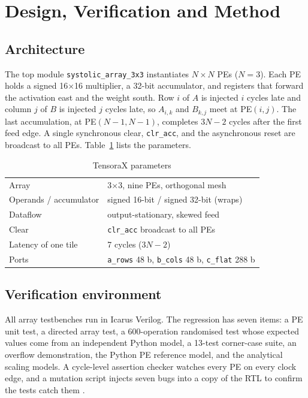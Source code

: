 \documentclass[conference]{IEEEtran}
\begin{document}
\section{Design, Verification and Method}
\subsection{Architecture}
The top module \texttt{systolic\_array\_3x3} instantiates $N\times N$ PEs ($N=3$). Each PE holds a signed 16$\times$16 multiplier, a 32-bit accumulator, and registers that forward the activation east and the weight south. Row $i$ of $A$ is injected $i$ cycles late and column $j$ of $B$ is injected $j$ cycles late, so $A_{i,k}$ and $B_{k,j}$ meet at PE$(i,j)$. The last accumulation, at PE$(N-1,N-1)$, completes $3N-2$ cycles after the first feed edge. A single synchronous clear, \texttt{clr\_acc}, and the asynchronous reset are broadcast to all PEs. Table~\ref{tab:params} lists the parameters.

\begin{table}[!t]
\caption{TensoraX parameters}
\label{tab:params}
\centering\footnotesize
\begin{tabular}{@{}ll@{}}
\toprule
Array & 3$\times$3, nine PEs, orthogonal mesh \\
Operands / accumulator & signed 16-bit / signed 32-bit (wraps) \\
Dataflow & output-stationary, skewed feed \\
Clear & \texttt{clr\_acc} broadcast to all PEs \\
Latency of one tile & 7 cycles ($3N-2$) \\
Ports & \texttt{a\_rows} 48 b, \texttt{b\_cols} 48 b, \texttt{c\_flat} 288 b \\
\bottomrule
\end{tabular}
\end{table}

\subsection{Verification environment}
All array testbenches run in Icarus Verilog. The regression has seven items: a PE unit test, a directed array test, a 600-operation randomised test whose expected values come from an independent Python model, a 13-test corner-case suite, an overflow demonstration, the Python PE reference model, and the analytical scaling models. A cycle-level assertion checker watches every PE on every clock edge, and a mutation script injects seven bugs into a copy of the RTL to confirm the tests catch them \cite{repo}.
\end{document}
